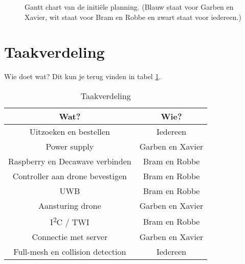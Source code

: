 \begin{figure}[p]
\begin{ganttchart}[vgrid, y unit chart=0.75cm]{1}{13}
\end{ganttchart}
\caption[Gantt chart van de initi\"ele planning.]{Gantt chart van de initi\"ele planning. (Blauw staat voor Garben en Xavier, wit staat voor Bram en Robbe en zwart staat voor iedereen.)}
\label{fig:initiele_planning}
\end{figure}

\section{Taakverdeling} \label{sec:taakverdeling}
Wie doet wat? Dit kun je terug vinden in tabel \ref{tab:taakverdeling}.
\begin{table}[p]
\centering
\begin{tabular}{ |c|c| }
\hline
Wat? & Wie?\\ [.5ex]
\hline\hline
Uitzoeken en bestellen & Iedereen\\
\hline
Power supply & Garben en Xavier\\
\hline
Raspberry en Decawave verbinden & Bram en Robbe\\
\hline
Controller aan drone bevestigen & Bram en Robbe\\
\hline
UWB & Bram en Robbe\\
\hline
Aansturing drone & Garben en Xavier\\
\hline
I\textsuperscript{2}C / TWI & Bram en Robbe\\
\hline
Connectie met server & Garben en Xavier\\
\hline
Full-mesh en collision detection & Iedereen\\
\hline
\end{tabular}
\caption{Taakverdeling}
\label{tab:taakverdeling}
\end{table}

